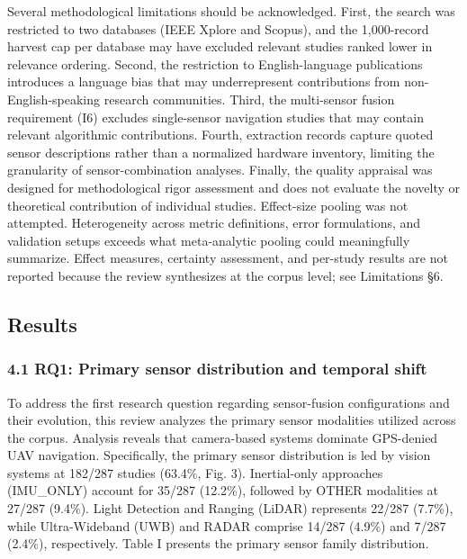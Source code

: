 \documentclass[conference]{IEEEtran}
\begin{document}
Several methodological limitations should be acknowledged. First, the search was restricted to two databases (IEEE Xplore and Scopus), and the 1,000-record harvest cap per database may have excluded relevant studies ranked lower in relevance ordering. Second, the restriction to English-language publications introduces a language bias that may underrepresent contributions from non-English-speaking research communities. Third, the multi-sensor fusion requirement (I6) excludes single-sensor navigation studies that may contain relevant algorithmic contributions. Fourth, extraction records capture quoted sensor descriptions rather than a normalized hardware inventory, limiting the granularity of sensor-combination analyses. Finally, the quality appraisal was designed for methodological rigor assessment and does not evaluate the novelty or theoretical contribution of individual studies. Effect-size pooling was not attempted. Heterogeneity across metric definitions, error formulations, and validation setups exceeds what meta-analytic pooling could meaningfully summarize. Effect measures, certainty assessment, and per-study results are not reported because the review synthesizes at the corpus level; see Limitations §6.



\subsection{Results}


\subsubsection{4.1 RQ1: Primary sensor distribution and temporal shift}


To address the first research question regarding sensor-fusion configurations and their evolution, this review analyzes the primary sensor modalities utilized across the corpus. Analysis reveals that camera-based systems dominate GPS-denied UAV navigation. Specifically, the primary sensor distribution is led by vision systems at 182/287 studies (63.4\%, Fig. 3). Inertial-only approaches (IMU\_ONLY) account for 35/287 (12.2\%), followed by OTHER modalities at 27/287 (9.4\%). Light Detection and Ranging (LiDAR) represents 22/287 (7.7\%), while Ultra-Wideband (UWB) and RADAR comprise 14/287 (4.9\%) and 7/287 (2.4\%), respectively. Table I presents the primary sensor family distribution.
\end{document}
